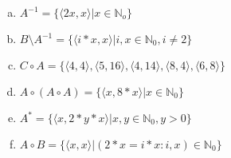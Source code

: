 \documentclass{article} %
\begin{document}
\begin{enumerate}[(a)]
	\item
	$ A^{-1} = \{\langle 2x,x \rangle \lvert x \in \mathbb N_o \}$
	\item
	$ B \setminus A^{-1} = \{\langle i*x,x \rangle \lvert i,x \in \mathbb N_0, i \neq 2\}$
	\item
	$C \circ A = \{\langle 4,4 \rangle,\langle 5,16 \rangle, \langle 4,14\rangle, \langle 8,4 \rangle,\langle 6,8\rangle\}$
	\item
	$A \circ (A \circ A) = \{ \langle x,8*x\rangle\lvert x\in \mathbb N_0\}$
 	\item
	 $A^{*} = \{\langle x ,2*y*x\rangle\lvert x,y \in \mathbb N_0, y>0\}$
	 \item 
	 $A \circ B = \{\langle x,x\rangle \lvert (2*x = i*x : i,x) \in \mathbb N_0\}$

\end{enumerate}
\end{document}
